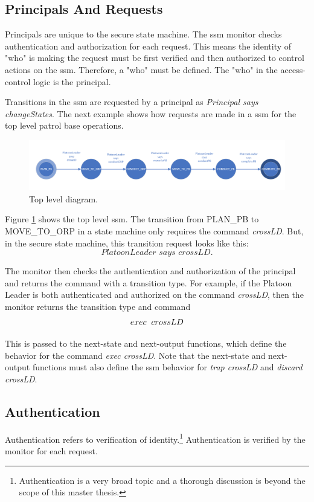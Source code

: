 \documentclass[../../main/main.tex]{subfiles}
\begin{document}
\subsection{Principals And Requests}
Principals are unique to the secure state machine.  The \gls{ssm} monitor checks authentication and authorization for each request.  This means the identity of "who" is making the request must be first verified and then authorized to control actions on the \gls{ssm}.  Therefore, a "who" must be defined.  The "who" in the access-control logic is the principal.  

Transitions in the \gls{ssm} are requested by a principal as \textit{Principal says changeStates}.  The next example shows how requests are made in a \gls{ssm} for the top level patrol base operations.

\begin{figure}[h!]
\centering
\includegraphics[width=\textwidth]{../figures/ssmPBDiagram}
\caption{\label{ssmPBDiagram2} Top level diagram.}
\end{figure}

Figure \ref{ssmPBDiagram2} shows the top level \gls{ssm}.  The transition from PLAN_PB to MOVE_TO_ORP in a state machine only requires the command \textit{crossLD}.  But, in the secure state machine, this transition request looks like this:
 \[\textit{PlatoonLeader says crossLD}.\]

The monitor then checks the authentication and authorization of the principal and returns the command with a transition type.  For example, if the Platoon Leader is both authenticated and authorized on the command \textit{crossLD}, then the monitor returns the transition type and command
\[exec \hspace{0.2cm} crossLD\]

This is passed to the next-state and next-output functions, which define the behavior for the command \textit{exec crossLD}.  Note that the next-state and next-output functions must also define the \gls{ssm} behavior for \textit{trap crossLD} and \textit{discard crossLD}.

\subsection{Authentication}
Authentication refers to verification of identity.\footnote{Authentication is a very broad topic and a thorough discussion is beyond the scope of this master thesis.}  Authentication is verified by the monitor for each request. 
\end{document}
